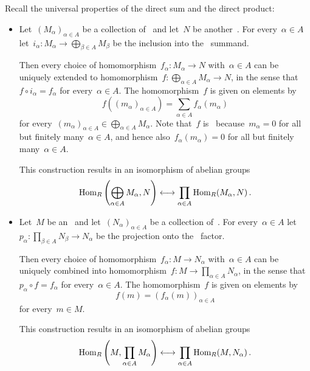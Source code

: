 \section{}

Recall the universal properties of the direct sum and the direct product:

\begin{itemize}
  \item
    Let~$(M_\alpha)_{\alpha \in A}$ be a collection of~{} and let~$N$ be another~{}.
    For every~$\alpha \in A$ let~$i_\alpha \colon M_\alpha \to \bigoplus_{\beta \in A} M_\beta$ be the inclusion into the~ summand.
    
    Then every choice of homomorphism~$f_\alpha \colon M_\alpha \to N$ with~$\alpha \in A$ can be uniquely extended to homomorphism~$f \colon \bigoplus_{\alpha \in A} M_\alpha \to N$, in the sense that~$f \circ i_\alpha = f_\alpha$ for every~$\alpha \in A$.
    The homomorphism~$f$ is given on elements by
    \[
        f\left( (m_\alpha)_{\alpha \in A} \right)
      = \sum_{\alpha \in A} f_\alpha(m_\alpha)
    \]
    for every~$(m_\alpha)_{\alpha \in A} \in \bigoplus_{\alpha \in A} M_\alpha$.
    Note that~$f$ is~{\welldef} because~$m_\alpha = 0$ for all but finitely many~$\alpha \in A$, and hence also~$f_\alpha(m_\alpha) = 0$ for all but finitely many~$\alpha \in A$.
    
    This construction results in an isomorphism of abelian groups
    \[
        \operatorname{Hom}_R\left( \bigoplus_{\alpha \in A} M_\alpha, N \right)
      \longleftrightarrow
        \prod_{\alpha \in A} \operatorname{Hom}_R(M_\alpha, N) \,.
    \]
  \item
    Let~$M$ be an~{} and let~$(N_\alpha)_{\alpha \in A}$ be a collection of~{}.
    For every~$\alpha \in A$ let~$p_\alpha \colon \prod_{\beta \in A} N_\beta \to N_\alpha$ be the projection onto the~ factor.
    
    Then every choice of homomorphism~$f_\alpha \colon M \to N_\alpha$ with~$\alpha \in A$ can be uniquely combined into homomorphism~$f \colon M \to \prod_{\alpha \in A} N_\alpha$, in the sense that~$p_\alpha \circ f = f_\alpha$ for every~$\alpha \in A$.
    The homomorphism~$f$ is given on elements by
    \[
        f(m)
      = ( f_\alpha(m) )_{\alpha \in A}
    \]
    for every~$m \in M$.
    
    This construction results in an isomorphism of abelian groups
    \begin{equation}
      \label{iso for product}
        \operatorname{Hom}_R\left( M, \prod_{\alpha \in A} M_\alpha \right)
      \longleftrightarrow
        \prod_{\alpha \in A} \operatorname{Hom}_R(M, N_\alpha) \,.
    \end{equation}
\end{itemize}

